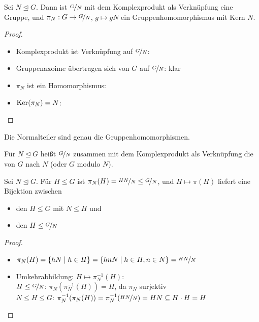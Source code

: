 \begin{proposition}
	Sei $N\unlhd G$. Dann ist $\nicefrac{G}{N}$ mit dem Komplexprodukt als Verknüpfung eine Gruppe, und $\pi_N:G\to\nicefrac{G}{N}$, $g\mapsto gN$ ein Gruppenhomomorphismus mit Kern $N$.
\end{proposition}
\begin{proof}
	\begin{itemize}
		\item Komplexprodukt ist Verknüpfung auf $\nicefrac{G}{N}$: 
		\item Gruppenaxoime übertragen sich von $G$ auf $\nicefrac{G}{N}$: klar
		\item $\pi_N$ ist ein Homomorphismus: 
		\item $\operatorname{Ker}(\pi_N)=N$: 
	\end{itemize}
\end{proof}

\begin{conclusion}
	Die Normalteiler sind genau die Gruppenhomomorphismen.
\end{conclusion}

\begin{definition}[Quotientengruppe]
	Für $N\unlhd G$ heißt $\nicefrac{G}{N}$ zusammen mit dem Komplexprodukt als Verknüpfung die  von $G$ nach $N$ (oder $G$ modulo $N$).
\end{definition}

\begin{lemma}
	Sei $N\unlhd G$. Für $H\le G$ ist $\pi_N(H)=\nicefrac{HN}{N}\le\nicefrac{G}{N}$, und $H\mapsto \pi(H)$ liefert eine Bijektion zwischen 
	\begin{itemize}
		\item den $H\le G$ mit $N\le H$ und
		\item den $H\le\nicefrac{G}{N}$
	\end{itemize}
\end{lemma}
\begin{proof}
	\begin{itemize}
		\item $\pi_N(H)=\{hN\mid h\in H\}=\{hnN\mid h\in H, n\in N\}=\nicefrac{HN}{N}$
		\item Umkehrabbildung: $H\mapsto \pi_N^{-1}(H)$: \\
		$H\le\nicefrac{G}{N}$: $\pi_N(\pi_N^{-1}(H))=H$, da $\pi_N$ surjektiv \\
		$N\le H\le G$: $\pi_N^{-1}(\pi_N(H))=\pi_N^{-1}(\nicefrac{HN}{N})=HN\subseteq H\cdot H=H$
	\end{itemize}
\end{proof}

